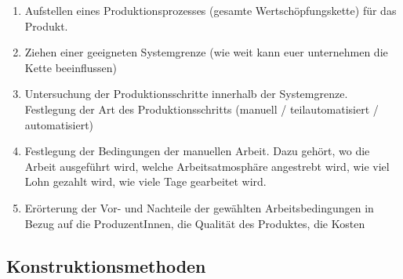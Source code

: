 \documentclass[headinclude=true]{scrartcl}
\begin{document}
\begin{enumerate}
	\item
	      Aufstellen eines Produktionsprozesses (gesamte Wertschöpfungskette)
	      für das Produkt.
	\item
	      Ziehen einer geeigneten Systemgrenze (wie weit kann euer 
	      unternehmen die Kette beeinflussen)
	\item
	      Untersuchung der Produktionsschritte innerhalb der Systemgrenze.
	      Festlegung der Art des Produktionsschritts (manuell /
	      teilautomatisiert / automatisiert)
	\item
	      Festlegung der Bedingungen der manuellen Arbeit. Dazu gehört, wo die
	      Arbeit ausgeführt wird, welche Arbeitsatmosphäre angestrebt wird, wie
	      viel Lohn gezahlt wird, wie viele Tage gearbeitet wird.
	\item
	      Erörterung der Vor- und Nachteile der gewählten Arbeitsbedingungen in
	      Bezug auf die ProduzentInnen, die Qualität des Produktes, die Kosten
\end{enumerate}

\subsection{Konstruktionsmethoden}
\end{document}
